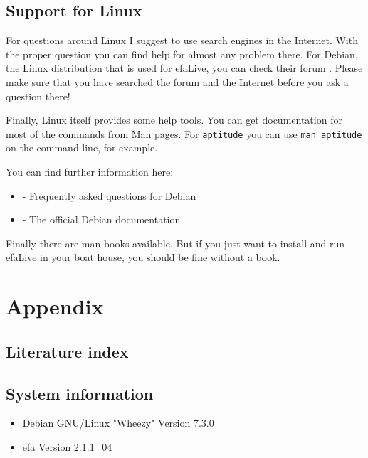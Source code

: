 \documentclass[a4paper,12pt,twoside]{article}
\begin{document}
\subsection{Support for Linux}
\label{support_linux}
For questions around Linux I suggest to use search engines in the
Internet. With the proper question you can find help for almost any
problem there. For Debian, the Linux distribution that is used for
efaLive, you can check their forum \cite{HLP1}. Please make sure that
you have searched the forum and the Internet before you ask a question
there!

Finally, Linux itself provides some help tools. You can get
documentation for most of the commands from Man pages. For
\texttt{aptitude} you can use \texttt{man
aptitude} on the command line, for example.

You can find further information here:

\begin{itemize}
    \item \cite{HLP2} - Frequently asked questions for Debian
    \item \cite{HLP3} - The official Debian documentation
\end{itemize}

Finally there are man books available. But if you just want to install
and run efaLive in your boat house, you should be fine without a book.


\clearpage
\section{Appendix}
\label{sct:appendix}
\subsection{Literature index}
\label{sct:literature}




\subsection{System information}
\label{sct:sysinfo}

\begin{itemize}
    \item Debian GNU/Linux "Wheezy" Version 7.3.0
    \item efa Version 2.1.1\_04
\end{itemize}
\end{document}
